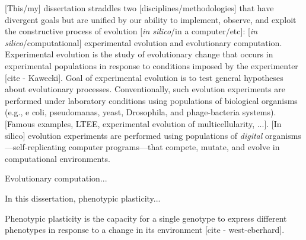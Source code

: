 



[This/my] dissertation straddles two [disciplines/methodologies] that have divergent goals but are unified by our ability to implement, observe, and exploit the constructive process of evolution [\textit{in silico}/in a computer/etc]: [\textit{in silico}/computational] experimental evolution and evolutionary computation.
Experimental evolution is the study of evolutionary change that occurs in experimental populations in response to conditions imposed by the experimenter [cite - Kawecki].
Goal of experimental evolution is to test general hypotheses about evolutionary processes. 
Conventionally, such evolution experiments are performed under laboratory conditions using populations of biological organisms (e.g., e coli, pseudomanas, yeast, Drosophila, and phage-bacteria systems). 
[Famous examples, LTEE, experimental evolution of multicellularity, ...].
[In silico] evolution experiments are performed using populations of \textit{digital} organisms---self-replicating computer programs---that compete, mutate, and evolve in computational environments. 

Evolutionary computation...


In this dissertation, phenotypic plasticity...


Phenotypic plasticity is the capacity for a single genotype to express different phenotypes in response to a change in its environment [cite - west-eberhard].












